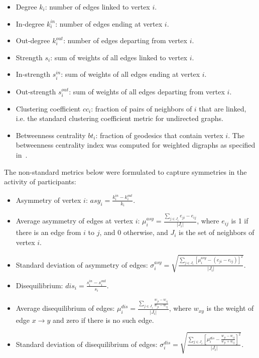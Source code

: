 \documentclass[%
	aip,
	jmp,%
	amsmath,amssymb,
	reprint,%
]{revtex4-1}
\begin{document}
\begin{itemize}
	\item Degree     $k_i$: number of edges linked to vertex $i$.
	\item In-degree  $k_i^{in}$: number of edges ending at vertex $i$.
	\item Out-degree $k_i^{out}$: number of edges departing from vertex $i$.
	\item Strength $s_i$: sum of weights of all edges linked to vertex $i$.
	\item In-strength $s_i^{in}$: sum of weights of all edges ending at vertex $i$.
	\item Out-strength $s_i^{out}$: sum of weights of all edges departing from vertex $i$.
	\item Clustering coefficient $cc_i$: fraction of pairs of neighbors of $i$ that are linked, i.e. the standard clustering coefficient metric for undirected graphs.
	\item Betweenness centrality $bt_i$: fraction of geodesics that contain vertex $i$. The betweenness centrality index was computed for weighted digraphs as specified in~\cite{faster}.
\end{itemize}

The non-standard metrics below were formulated to capture symmetries in the activity of participants:

\begin{itemize}
	\item Asymmetry of vertex $i$: $asy_i=\frac{k_i^{in}-k_i^{out}}{k_i}$.
	\item Average asymmetry of edges at vertex $i$: $\mu_i^{asy}=\frac{\sum_{j\in J_i} e_{ji}-e_{ij}}{|J_i|}$, where $e_{ij}$ is 1 if there is an edge from $i$ to $j$, and $0$ otherwise, and $J_i$ is the set of neighbors of vertex $i$.
	\item Standard deviation of asymmetry of edges: $\sigma_i^{asy}=\sqrt{\frac{\sum_{j\in J_i}[\mu^{asy}_i -(e_{ji}-e_{ij}) ]^2  }{|J_i|}  }$.
	\item Disequilibrium: $dis_i=\frac{s_i^{in}-s_i^{out}}{s_i}$.
	\item Average disequilibrium of edges: $\mu_i^{dis}=\frac{\sum_{j \in J_i}\frac{w_{ji}-w_{ij}}{w_{ji}-w_{ij}}}{|J_i|}$, where $w_{xy}$ is the weight of edge $x\rightarrow y$ and zero if there is no such edge.
	\item Standard deviation of disequilibrium of edges: $\sigma_i^{dis}=\sqrt{\frac{\sum_{j\in J_i}\left[\mu^{dis}_i-\frac{w_{ji}-w_{ij}}{w_{ji}+w_{ij}}\right]^2}{|J_i|}}$.
\end{itemize}
\end{document}
